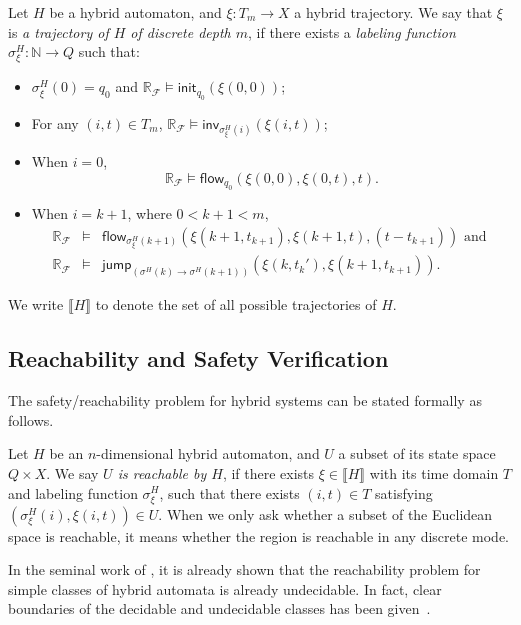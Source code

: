 \documentclass[envcountsect]{llncs}
\newcommand{\flow}{\mathsf{flow}}
\newcommand{\jump}{\mathsf{jump}}
\newcommand{\inv}{\mathsf{inv}}
\newcommand{\init}{\mathsf{init}}
\begin{document}
\begin{definition}\label{trajec}
Let $H$ be a hybrid automaton, and $\xi: T_m\rightarrow X$ a hybrid trajectory.
We say that $\xi$ is {\em a trajectory of $H$ of discrete depth $m$}, if there
exists a {\em labeling function} $\sigma^H_{\xi}: \mathbb{N}\rightarrow Q$ such
that:
\begin{itemize}
\item $\sigma^H_{\xi}(0) = q_0$ and
$\mathbb{R}_{\mathcal{F}}\models \init_{q_0}(\xi(0,0))$;
\item For any $(i, t)\in T_m$,
$\mathbb{R}_{\mathcal{F}}\models \inv_{\sigma^H_{\xi}(i)} (\xi(i,t))$;
\item When $i=0$,
$$\mathbb{R}_{\mathcal{F}}\models\flow_{q_0}(\xi(0,0), \xi(0,t), t).$$
\item When $i = k+1$, where $0< k+1 <m$,
\begin{eqnarray*}
\mathbb{R}_{\mathcal{F}}&\models&\flow_{\sigma^H_{\xi}(k+1)}(\xi(k+1, t_{k+1}),
\xi(k+1, t), (t - t_{k+1}))\mbox{ and }\\
\mathbb{R}_{\mathcal{F}}&\models& \jump_{(\sigma^H(k)\rightarrow
\sigma^H(k+1))}(\xi(k, t_k'), \xi(k+1,t_{k+1})).
\end{eqnarray*}
\end{itemize}
\end{definition}
We write $\llbracket H\rrbracket$ to denote the set of all possible trajectories
of $H$.

\subsection{Reachability and Safety Verification}

The safety/reachability problem for hybrid systems can be stated formally as
follows. 
\begin{definition}[Reachability]\label{reachability}
Let $H$ be an $n$-dimensional hybrid automaton, and $U$ a subset of its state
space $Q\times X$.  We say {\em $U$ is reachable by $H$}, if there exists
$\xi\in\llbracket
H \rrbracket$ with its time domain $T$ and labeling function
$\sigma_{\xi}^H$, such that there exists $(i,t)\in T$ satisfying
$(\sigma^H_{\xi}(i), \xi(i,t))\in U.$ When we only ask whether a subset of the
Euclidean space is reachable, it means whether the region is reachable in any
discrete mode.
\end{definition}
In the seminal work of \cite{DBLP:conf/rex/AlurD91,DBLP:conf/hybrid/AlurCHH92},
it is already shown that the reachability problem for simple classes of hybrid
automata is already undecidable. In fact, clear boundaries of the decidable and
undecidable classes has been given~\cite{DBLP:journals/jcss/HenzingerKPV98}.
\end{document}
